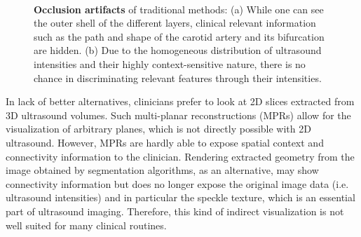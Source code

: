 \begin{figure}[ht]
	\centering
	 \\%
	\caption{
		\textbf{Occlusion artifacts} of traditional methods:
		(a) While one can see the outer shell of the different layers, clinical relevant information such as the path and shape of the carotid artery and its bifurcation are hidden.
		(b) Due to the homogeneous distribution of ultrasound intensities and their highly context-sensitive nature, there is no chance in discriminating relevant features through their intensities.
	}
	\label{fig:predicates:occlusion}
\end{figure}

In lack of better alternatives, clinicians prefer to look at 2D slices extracted from 3D ultrasound volumes. 
Such multi-planar reconstructions (MPRs) allow for the visualization of arbitrary planes, which is not directly possible with 2D ultrasound. 
However, MPRs are hardly able to expose spatial context and connectivity information to the clinician. 
Rendering extracted geometry from the image obtained by segmentation algorithms, as an alternative, may show connectivity information but does no longer expose the original image data (i.e. ultrasound intensities) and in particular the speckle texture, which is an essential part of ultrasound imaging. 
Therefore, this kind of indirect visualization is not well suited for many clinical routines. 

